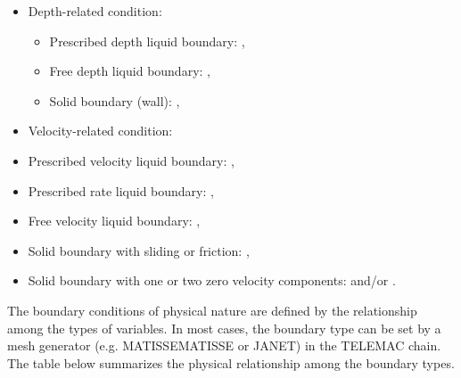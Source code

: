 \begin{itemize}
\item Depth-related condition:

\begin{itemize}
\item Prescribed depth liquid boundary: ,

\item Free depth liquid boundary: ,

\item Solid boundary (wall): ,
\end{itemize}

\item Velocity-related condition:

\item Prescribed velocity liquid boundary: ,

\item Prescribed rate liquid boundary: ,

\item Free velocity liquid boundary: ,

\item Solid boundary with sliding or friction: ,

\item Solid boundary with one or two zero velocity components:  and/or
.
\end{itemize}

The boundary conditions of physical nature are defined by the relationship
among the types of variables. In most cases, the boundary type can be set by a
mesh generator (e.g. MATISSEMATISSE or JANET) in the TELEMAC chain. The table
below summarizes the physical relationship among the boundary types.


